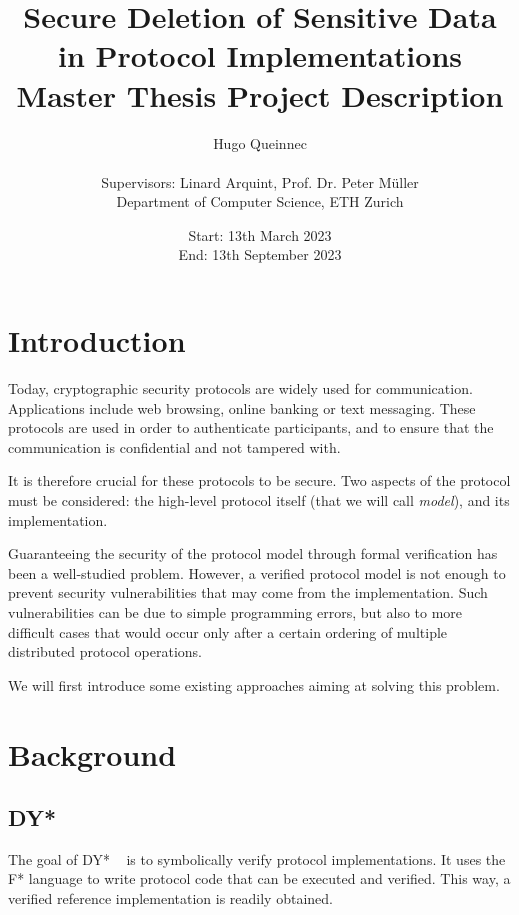 \documentclass{article}
\title{Secure Deletion of Sensitive Data in Protocol Implementations\\
{\large Master Thesis Project Description}}
\author{Hugo Queinnec \\ \\ Supervisors: Linard Arquint, Prof. Dr. Peter Müller \\
Department of Computer Science, ETH Zurich}
\date{Start: 13th March 2023 \\
      End: 13th September 2023}
\begin{document}
\maketitle

\thispagestyle{plain}
\pagestyle{plain}


\section{Introduction}

Today, cryptographic security protocols are widely used for communication. Applications include web browsing, online banking or text messaging. These protocols are used in order to authenticate participants, and to ensure that the communication is confidential and not tampered with.

It is therefore crucial for these protocols to be secure. Two aspects of the protocol must be considered: the high-level protocol itself (that we will call \textit{model}), and its implementation.

Guaranteeing the security of the protocol model through formal verification has been a well-studied problem. However, a verified protocol model is not enough to prevent security vulnerabilities that may come from the implementation. Such vulnerabilities can be due to simple programming errors, but also to more difficult cases that would occur only after a certain ordering of multiple distributed protocol operations.

We will first introduce some existing approaches aiming at solving this problem.

\section{Background}
\subsection{DY*}

The goal of DY* ~\cite{bhargavan2021text} is to symbolically verify protocol implementations. It uses the F* language to write protocol code that can be executed and verified. This way, a verified reference implementation is readily obtained.
\end{document}
